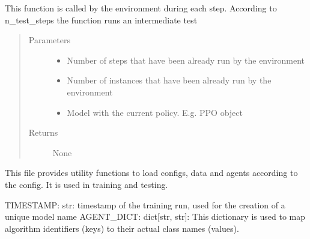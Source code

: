 \documentclass[letterpaper,10pt,english]{sphinxmanual}
\begin{document}
\begin{fulllineitems}

\begin{fulllineitems}
\label{\detokenize{agents.reinforcement_learning:agents.intermediate_test.IntermediateTest.on_step}}
\sphinxAtStartPar
This function is called by the environment during each step.
According to n\_test\_steps the function runs an intermediate test
\begin{quote}\begin{description}
\item[{Parameters}] \leavevmode\begin{itemize}
\item {} 
\sphinxAtStartPar
{} \textendash{} Number of steps that have been already run by the environment

\item {} 
\sphinxAtStartPar
{} \textendash{} Number of instances that have been already run by the environment

\item {} 
\sphinxAtStartPar
{} \textendash{} Model with the current policy. E.g. PPO object

\end{itemize}

\item[{Returns}] \leavevmode
\sphinxAtStartPar
None

\end{description}\end{quote}

\end{fulllineitems}


\end{fulllineitems}


\sphinxAtStartPar
This file provides utility functions to load configs, data and agents according to the config. It is used in training
and testing.

\sphinxAtStartPar
TIMESTAMP: str: timestamp of the training run, used for the creation of a unique model name
AGENT\_DICT: dict{[}str, str{]}: This dictionary is used to map algorithm identifiers (keys)
to their actual class names (values).
\end{document}
